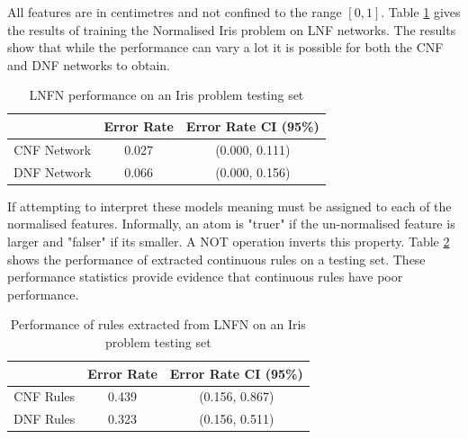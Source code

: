 \noindent
\begin{minipage}[t]{0.35\textwidth}
	All features are in centimetres and not confined to the range $[0, 1]$. Table \ref{tab:iris-network-peformance-comp} gives the results of training the Normalised Iris problem on LNF networks. The results show that while the performance can vary a lot it is possible for both the CNF and DNF networks to obtain.\\
\end{minipage}
\hspace{0.05\textwidth}
\begin{minipage}[t]{0.50\textwidth}
	\begin{table}[H]
		\begin{center}
			\begin{tabular}{| c | c | c |}
				\hline
				& Error Rate & Error Rate CI (95\%) \\
				\hline
				\hline
				CNF Network & 0.027 & (0.000, 0.111) \\
				\hline
				DNF Network & 0.066 & (0.000, 0.156) \\
				\hline
			\end{tabular}
		\end{center}
		\caption{LNFN performance on an Iris problem testing set}
		\label{tab:iris-network-peformance-comp}
	\end{table}
\end{minipage}

If attempting to interpret these models meaning must be assigned to each of the normalised features. Informally, an atom is "truer" if the un-normalised feature is larger and "falser" if its smaller. A NOT operation inverts this property. Table \ref{tab:iris-rule-peformance-comp} shows the performance of extracted continuous rules on a testing set. These performance statistics provide evidence that continuous rules have poor performance.

\begin{table}[H]
	\begin{center}
		\begin{tabular}{| c | c | c |}
			\hline
			& Error Rate & Error Rate CI (95\%) \\
			\hline
			\hline
			CNF Rules & 0.439 & (0.156, 0.867) \\
			\hline
			DNF Rules & 0.323 & (0.156, 0.511) \\
			\hline
		\end{tabular}
	\end{center}
	\caption{Performance of rules extracted from LNFN on an Iris problem testing set}
	\label{tab:iris-rule-peformance-comp}
\end{table}


